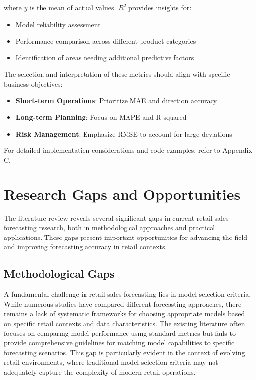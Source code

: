 \documentclass[12pt,a4paper]{report}
\begin{document}
where \(\bar{y}\) is the mean of actual values. \(R^2\) provides insights for:
\begin{itemize}
    \item Model reliability assessment
    \item Performance comparison across different product categories
    \item Identification of areas needing additional predictive factors
\end{itemize}

The selection and interpretation of these metrics should align with specific business objectives:

\begin{itemize}
    \item \textbf{Short-term Operations}: Prioritize MAE and direction accuracy
    \item \textbf{Long-term Planning}: Focus on MAPE and R-squared
    \item \textbf{Risk Management}: Emphasize RMSE to account for large deviations
\end{itemize}

For detailed implementation considerations and code examples, refer to Appendix C.

\section{Research Gaps and Opportunities}

The literature review reveals several significant gaps in current retail sales forecasting research, both in methodological approaches and practical applications. These gaps present important opportunities for advancing the field and improving forecasting accuracy in retail contexts.

\subsection{Methodological Gaps}

A fundamental challenge in retail sales forecasting lies in model selection criteria. While numerous studies have compared different forecasting approaches, there remains a lack of systematic frameworks for choosing appropriate models based on specific retail contexts and data characteristics. The existing literature often focuses on comparing model performance using standard metrics but fails to provide comprehensive guidelines for matching model capabilities to specific forecasting scenarios. This gap is particularly evident in the context of evolving retail environments, where traditional model selection criteria may not adequately capture the complexity of modern retail operations.
\end{document}
